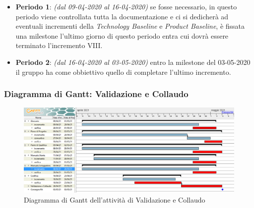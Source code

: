 \begin{itemize}
\item \textbf{Periodo 1}: \textit{(dal 09-04-2020 al 16-04-2020)} se fosse necessario, in questo periodo viene controllata tutta la documentazione e ci si dedicherà ad eventuali incrementi della \textit{Technology Baseline} e \textit{Product Baseline}, è fissata una milestone l'ultimo giorno di questo periodo entra cui dovrà essere terminato l'incremento VIII.

\item \textbf{Periodo 2}: \textit{(dal 16-04-2020 al 03-05-2020)} entro la milestone del 03-05-2020 il gruppo ha come obbiettivo quello di completare l'ultimo incremento.

\end{itemize}
\newpage
\subsubsection{Diagramma di Gantt: Validazione e Collaudo}
\begin{figure}[h]
	\centering
	\includegraphics[scale=0.5]{Images/GanttValidazioneCollaudo.PNG}
	\caption{Diagramma di Gantt dell'attività di Validazione e Collaudo}
\end{figure}